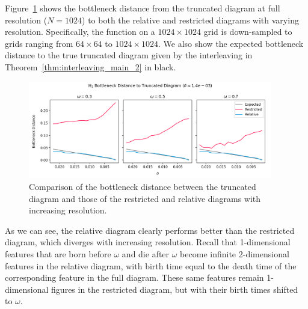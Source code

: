 Figure~\ref{fig:bottleneck} shows the bottleneck distance from the truncated diagram at full resolution ($N = 1024$) to both the relative and restricted diagrams with varying resolution.
Specifically, the function on a $1024\times 1024$ grid is down-sampled to grids ranging from $64\times 64$ to $1024\times 1024$.
We also show the expected bottleneck distance to the true truncated diagram given by the interleaving in Theorem~\ref{thm:interleaving_main_2} in black.

\begin{figure}[htbp]
  \centering
  \includegraphics[width=0.95\textwidth]{figures/matching2/bottleneck_delta.png}
  \caption{Comparison of the bottleneck distance between the truncated diagram and those of the restricted and relative diagrams with increasing resolution.}\label{fig:bottleneck}
\end{figure}

As we can see, the relative diagram clearly performs better than the restricted diagram, which diverges with increasing resolution.
Recall that 1-dimensional features that are born before $\omega$ and die after $\omega$ become infinite 2-dimensional features in the relative diagram, with birth time equal to the death time of the corresponding feature in the full diagram.
These same features remain 1-dimensional figures in the restricted diagram, but with their birth times shifted to $\omega$.

